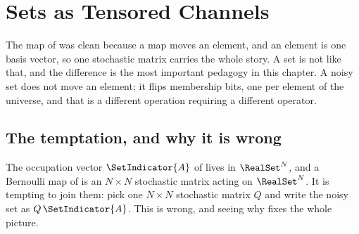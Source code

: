 %

\section{Sets as Tensored Channels}
\label{sec:operator-sets-tensored}

The map of  was clean because a map moves an
element, and an element is one basis vector, so one stochastic matrix carries
the whole story. A set is not like that, and the difference is the most
important pedagogy in this chapter. A noisy set does not move an element; it
flips membership bits, one per element of the universe, and that is a different
operation requiring a different operator.

\subsection*{The temptation, and why it is wrong}

The occupation vector $\SetIndicator{A}$ of  lives
in $\RealSet^{N}$, and a Bernoulli map of  is
an $N \times N$ stochastic matrix acting on $\RealSet^{N}$. It is tempting to
join them: pick one $N \times N$ stochastic matrix $Q$ and write the noisy set
as $Q\, \SetIndicator{A}$. This is wrong, and seeing why fixes the whole
picture.

